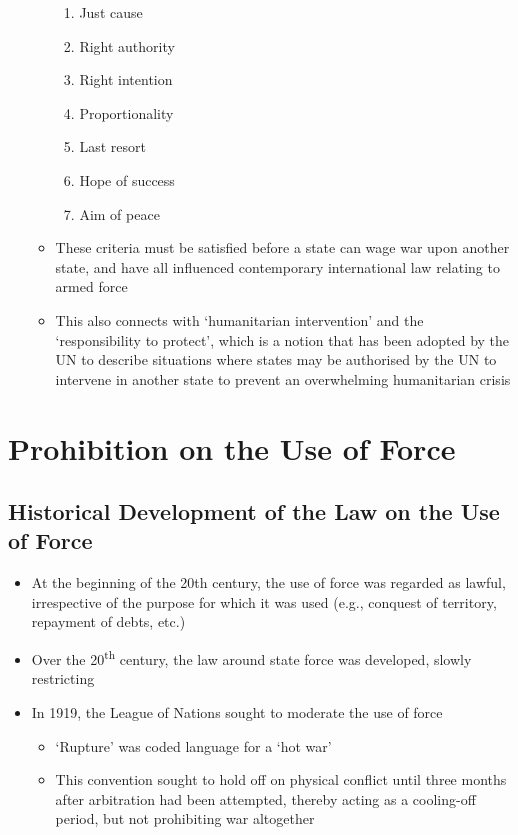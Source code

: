 \begin{itemize}
\begin{itemize}
\begin{enumerate}
            \item Just cause
            \item Right authority
            \item Right intention
            \item Proportionality
            \item Last resort
            \item Hope of success
            \item Aim of peace
        \end{enumerate}
        \item These criteria must be satisfied before a state can wage war upon another state, and have all influenced contemporary international law relating to armed force
        \item This also connects with `humanitarian intervention' and the `responsibility to protect', which is a notion that has been adopted by the UN to describe situations where states may be authorised by the UN to intervene in another state to prevent an overwhelming humanitarian crisis
    \end{itemize}
\end{itemize}

\section{Prohibition on the Use of Force}
\subsection{Historical Development of the Law on the Use of Force}
\begin{itemize}
    \item At the beginning of the 20th century, the use of force was regarded as lawful, irrespective of the purpose for which it was used (e.g., conquest of territory, repayment of debts, etc.)
    \item Over the 20\textsuperscript{th} century, the law around state force was developed, slowly restricting 
    \item In 1919, the League of Nations sought to moderate the use of force
    \begin{itemize}
        \item `Rupture' was coded language for a `hot war'
        \item This convention sought to hold off on physical conflict until three months after arbitration had been attempted, thereby acting as a cooling-off period, but not prohibiting war altogether
    \end{itemize}
\end{itemize}

